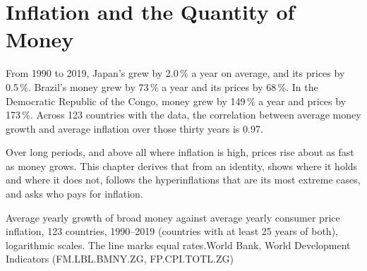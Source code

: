 \chapter{Inflation and the Quantity of Money}\label{ch:g12:inflation-and-money}

From 1990 to 2019, Japan's  grew by 2.0\,\% a year on average, and its prices by 0.5\,\%. Brazil's money grew by 73\,\% a year and its prices by 68\,\%. In the
Democratic Republic of the Congo, money grew by 149\,\% a year and prices by 173\,\%. Across 123 countries with the data, the correlation between average money growth and
average inflation over those thirty years is 0.97.

Over long periods, and above all where inflation is high, prices rise about as fast as money grows. This chapter derives that from an identity, shows where it holds and
where it does not, follows the hyperinflations that are its most extreme cases, and asks who pays for inflation.

\begin{openingchart}{Average yearly growth of broad money against average yearly consumer price inflation, 123 countries, 1990--2019 (countries with at least 25 years of
both), logarithmic scales. The line marks equal rates.}{World Bank, World Development Indicators (FM.LBL.BMNY.ZG, FP.CPI.TOTL.ZG)}
\end{openingchart}

